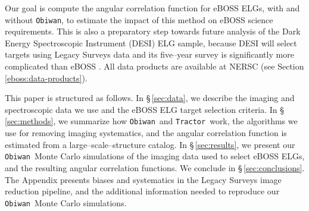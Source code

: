 \documentclass[a4paper,fleqn,usenatbib]{mnras}
\newcommand{\tractor}{{\tt Tractor}}
\newcommand{\obiwan}{{\tt Obiwan}}
\begin{document}
Our goal is compute the angular correlation function for eBOSS ELGs, with and without \obiwan, to estimate the impact of this method on eBOSS science requirements. This is also a preparatory step towards future analysis of the Dark Energy Spectroscopic Instrument (DESI) ELG sample, because DESI will select targets using Legacy Surveys data and its five--year survey is significantly more complicated than eBOSS \citep{desiScience, desiInstrument}.  All data products are available at NERSC (see Section \ref{eboss:data-products}).



This paper is structured as follows. In \S\,\ref{sec:data}, we describe the imaging and spectroscopic data we use and the eBOSS ELG target selection criteria. In \S\,\ref{sec:methods}, we summarize how \obiwan\, and \tractor\, work, the algorithms we use for removing imaging systematics, and the angular correlation function is estimated from a large--scale--structure catalog. In \S\,\ref{sec:results}, we present our \obiwan\, Monte Carlo simulations of the imaging data used to select eBOSS ELGs, and the resulting angular correlation functions. We conclude in \S\,\ref{sec:conclusions}. The Appendix presents biases and systematics in the Legacy Surveys image reduction pipeline, and the additional information needed to reproduce our \obiwan\, Monte Carlo simulations.
\end{document}
